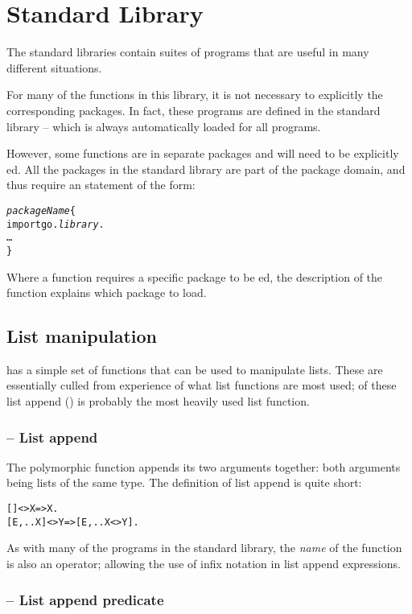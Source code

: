 \chapter{Standard Library}
\label{stdlib}
The standard libraries contain suites of programs that are useful in many different situations. 

For many of the functions in this library, it is not necessary to explicitly  the corresponding packages. In fact, these programs are defined in the standard library  -- which is always automatically loaded for all programs.

However, some functions are in separate packages and will need to be explicitly ed. All the packages in the standard library are part of the  package domain, and thus require an  statement of the form:
\begin{alltt}
\emph{packageName}\{
  import go.\emph{library}.
  \ldots
\}
\end{alltt}
Where a function requires a specific package to be ed, the description of the function explains which package to load.

\section{List manipulation}
\go has a simple set of functions that can be used to manipulate lists. These are essentially culled from experience of what list functions are most used; of these list append (\q{<>}) is probably the most heavily used list function.

\subsection{\function{<>} -- List append}
\label{stdlib:append}

The \q{<>} polymorphic function appends its two arguments together: both arguments being lists of the same type. The definition of list append is quite short:
\begin{alltt}
[] <> X => X.
[E,..X] <> Y => [E,..X<>Y].
\end{alltt}
As with many of the programs in the standard library, the \emph{name} of the function is also an operator; allowing the use of infix notation in list append expressions.

\subsection{ -- List append predicate}
\label{stdlib:app}

